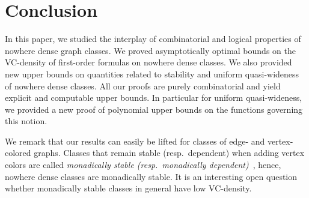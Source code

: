 \section{Conclusion}

In this paper, we studied the interplay of combinatorial and 
logical properties of nowhere dense graph classes. We proved
asymptotically optimal bounds on the VC-density of first-order 
formulas on nowhere dense classes. We also provided new
upper bounds on quantities related to stability and uniform quasi-wideness 
of nowhere dense classes.  All our proofs are purely combinatorial 
and yield explicit and computable upper bounds. In particular 
for uniform quasi-wideness, we provided a new
proof of polynomial upper bounds on the functions 
governing this notion. 

We remark that our results can easily be lifted for classes of edge- and 
vertex-colored graphs. Classes that remain stable (resp.\ dependent) when 
adding vertex colors are called \emph{monadically stable 
(resp.\ monadically dependent)}~\cite{baldwin1985second}, hence, nowhere dense
classes are monadically stable. It is an interesting open question whether
monadically stable classes in general have low VC-density. 